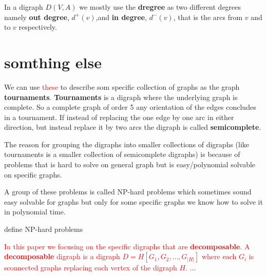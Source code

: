 In a digraph $D(V,A)$ we mostly use the \textbf{dregree} as two different degrees namely \textbf{out degree}, $d^+(v)$,and \textbf{in degree}, $d^-(v)$, that is the arcs from $v$ and to $v$ respectively.








\section{somthing else}
We can use \textcolor{red}{these} to describe som specific collection of graphs as the graph \textbf{tournaments}.
\textbf{Tournaments} is a digraph where the underlying graph is complete. 
So a complete graph of order 5 any orientation of the edges concludes in a tournament.
If instead of replacing the one edge by one arc in either direction, but instead replace it by two arcs the digraph is called \textbf{semicomplete}.

The reason for grouping the digraphs into smaller collections of digraphs (like tournaments is a smaller collection of semicomplete digraphs) is because of problems that is hard to solve on general graph but is easy/polynomial solvable on specific graphs.

A group of these problems is called NP-hard problems which sometimes sound easy solvable for graphs but only for some specific graphs we know how to solve it in polynomial time. 
\begin{definition}
    define NP-hard problems
\end{definition}

\textcolor{red}{In this paper we focusing on the specific digraphs that are \textbf{decomposable}. 
A \textbf{decomposable} digraph is a digraph $D=H[G_1,G_2,\dots,G_|H|]$ where each $G_i$ is sconnected graphs replacing each vertex of the digraph $H$.} ...
